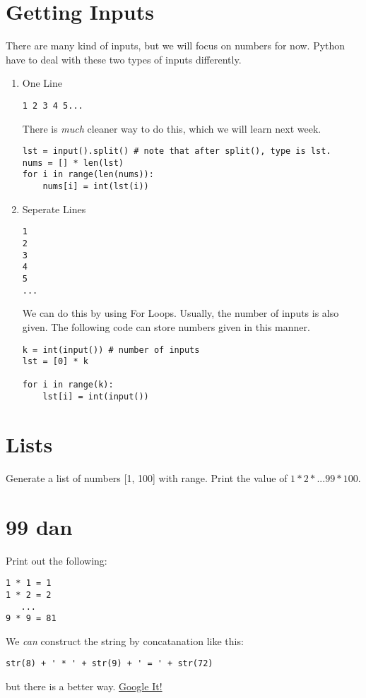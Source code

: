 \documentclass{article}
\begin{document}
\pagestyle{fancy}
\setcounter{section}{-1}

\section{Getting Inputs}
There are many kind of inputs, but we will focus on numbers for now.
Python have to deal with these two types of inputs differently.
\begin{enumerate}
  \item One Line
    \begin{lstlisting}
1 2 3 4 5...
    \end{lstlisting}
  There is \textit{much} cleaner way to do this, which we will learn next week.
  \begin{lstlisting}
lst = input().split() # note that after split(), type is lst.
nums = [] * len(lst)
for i in range(len(nums)):
    nums[i] = int(lst(i))
  \end{lstlisting}
  \item Seperate Lines
  \begin{lstlisting}
1
2
3
4
5
...
  \end{lstlisting}
  We can do this by using For Loops. Usually, the number of inputs is also given.
  The following code can store numbers given in this manner.
  \begin{lstlisting}
k = int(input()) # number of inputs
lst = [0] * k

for i in range(k):
    lst[i] = int(input())
  \end{lstlisting}
\end{enumerate}

\section{Lists}
Generate a list of numbers [1, 100] with range.
Print the value of $1 * 2 * ...99 * 100$.

\section{99 dan}
Print out the following:
\begin{lstlisting}
1 * 1 = 1
1 * 2 = 2
   ...
9 * 9 = 81
\end{lstlisting}
We \textit{can} construct the string by concatanation like this:
\begin{lstlisting}
str(8) + ' * ' + str(9) + ' = ' + str(72)
\end{lstlisting}
but there is a better way.
\href{https://www.google.com/search?q=python+string+format}{Google It!}
\end{document}
